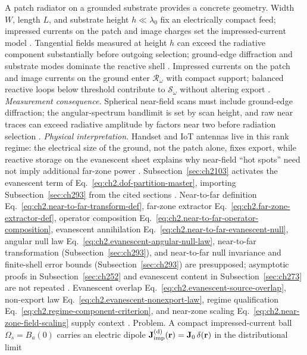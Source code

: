 A patch radiator on a grounded substrate provides a concrete geometry. Width $W$, length $L$, and
substrate height $h\ll\lambda_0$ fix an electrically compact feed; impressed currents on the patch
and image charges set the impressed-current model \cite{harrington2001,stratton1941}. Tangential
fields measured at height $h$ can exceed the radiative component substantially before outgoing
selection; ground-edge diffraction and substrate modes dominate the reactive shell
\cite{stratton1941}. Impressed currents on the patch and image
currents on the ground enter $\mathcal{R}_\omega$ with compact support; balanced reactive loops
below threshold contribute to $\mathcal{S}_\omega$ without altering export \cite{devaney2004}.
\emph{Measurement consequence.} Spherical near-field scans must include ground-edge diffraction;
the angular-spectrum bandlimit is set by scan height, and raw near traces can exceed radiative
amplitude by factors near two before radiation selection \cite{hansen1988}. \emph{Physical
interpretation.} Handset and IoT antennas live in this rank regime: the electrical size of the
ground, not the patch alone, fixes export, while reactive storage on the evanescent sheet explains
why near-field ``hot spots'' need not imply additional far-zone power \cite{harrington2001}.
Subsection~\ref{sec:ch2103} activates the evanescent term of
Eq.~\eqref{eq:ch2.dof-partition-master}, importing Subsection~\ref{sec:ch293} from the cited sections
\cite{stratton1941}. Near-to-far definition
Eq.~\eqref{eq:ch2.near-to-far-transform-def}, far-zone extractor
Eq.~\eqref{eq:ch2.far-zone-extractor-def}, operator composition
Eq.~\eqref{eq:ch2.near-to-far-operator-composition}, evanescent annihilation
Eq.~\eqref{eq:ch2.near-to-far-evanescent-null}, angular null law
Eq.~\eqref{eq:ch2.evanescent-angular-null-law}, near-to-far transformation (Subsection~\ref{sec:ch293}),
and near-to-far null invariance and finite-shell error bounds (Subsection~\ref{sec:ch293})
are presupposed; asymptotic proofs in Subsection~\ref{sec:ch252} and evanescent content in
Subsection~\ref{sec:ch273} are not repeated \cite{stratton1941}. Evanescent overlap
Eq.~\eqref{eq:ch2.evanescent-source-overlap}, non-export law
Eq.~\eqref{eq:ch2.evanescent-nonexport-law}, regime qualification
Eq.~\eqref{eq:ch2.regime-component-criterion}, and near-zone scaling
Eq.~\eqref{eq:ch2.near-zone-field-scaling} supply context \cite{harrington2001}.
Problem. A compact impressed-current ball \(\Omega_s=B_a(0)\) carries an electric dipole
\(\mathbf{J}_{\mathrm{imp}}^{(\mathrm{d})}(\mathbf{r})=\mathbf{J}_0\,\delta(\mathbf{r})\) in the distributional limit

